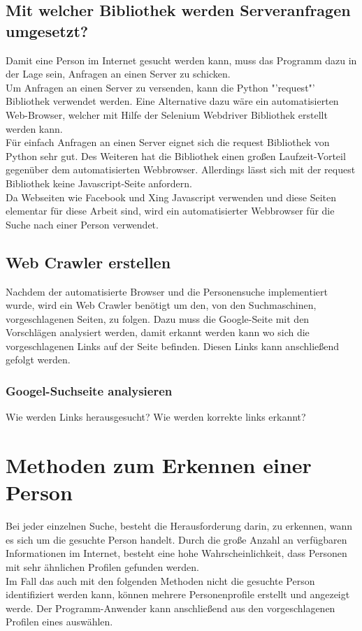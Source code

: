 		\subsection{Mit welcher Bibliothek werden Serveranfragen umgesetzt?}
		Damit eine Person im Internet gesucht werden kann, muss das Programm dazu in der Lage sein, Anfragen an einen Server zu schicken. \\
		Um Anfragen an einen Server zu versenden, kann die Python "'request"' Bibliothek verwendet werden. Eine Alternative dazu wäre ein automatisierten Web-Browser, welcher mit Hilfe der Selenium Webdriver Bibliothek erstellt werden kann.\\
		Für einfach Anfragen an einen Server eignet sich die request Bibliothek von Python sehr gut. Des Weiteren hat die Bibliothek einen großen Laufzeit-Vorteil gegenüber dem automatisierten Webbrowser. Allerdings lässt sich mit der request Bibliothek keine Javascript-Seite anfordern.\\
		Da Webseiten wie Facebook und Xing Javascript verwenden und diese Seiten elementar für diese Arbeit sind, wird ein automatisierter Webbrowser für die Suche nach einer Person verwendet.
	
		\subsection{Web Crawler erstellen}
		Nachdem der automatisierte Browser und die Personensuche implementiert wurde, wird ein Web Crawler benötigt um den, von den Suchmaschinen, vorgeschlagenen Seiten, zu folgen. Dazu muss die Google-Seite mit den Vorschlägen analysiert werden, damit erkannt werden kann wo sich die vorgeschlagenen Links auf der Seite befinden. Diesen Links kann anschließend gefolgt werden.
			\subsubsection{Googel-Suchseite analysieren}
			Wie werden Links herausgesucht?
			Wie werden korrekte links erkannt?
			
\section{Methoden zum Erkennen einer Person}
\label{sec:WannhandeltessichumdiegesuchtePerson}
Bei jeder einzelnen Suche, besteht die Herausforderung darin, zu erkennen, wann es sich um die gesuchte Person handelt. Durch die große Anzahl an verfügbaren Informationen im Internet, besteht eine hohe Wahrscheinlichkeit, dass Personen mit sehr ähnlichen Profilen gefunden werden.\\
Im Fall das auch mit den folgenden Methoden nicht die gesuchte Person identifiziert werden kann, können mehrere Personenprofile erstellt und angezeigt werde. Der Programm-Anwender kann anschließend aus den vorgeschlagenen Profilen eines auswählen.

